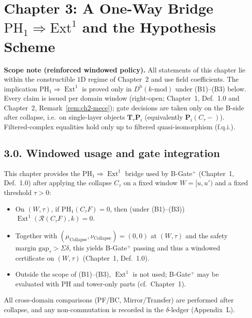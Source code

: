 \documentclass[11pt]{article}
\numberwithin{equation}{section}
\theoremstyle{plain}
\theoremstyle{definition}
\theoremstyle{remark}
\DeclareMathOperator{\Ext}{Ext}
\theoremstyle{plain}
\theoremstyle{definition}
\numberwithin{equation}{section}
\theoremstyle{definition}
\numberwithin{equation}{section}
\theoremstyle{plain}
\theoremstyle{definition}
\theoremstyle{remark}
\begin{document}
\section{Chapter 3: A One-Way Bridge \texorpdfstring{$\mathrm{PH}_1\!\Rightarrow\!\mathrm{Ext}^1$}{PH1⇒Ext1} and the Hypothesis Scheme}

\noindent\textbf{Scope note (reinforced windowed policy).}
All statements of this chapter lie within the constructible \(1\)D regime of Chapter~2 and use field coefficients.
The implication \(\mathrm{PH}_1\Rightarrow \Ext^1\) is proved only in \(D^{\mathrm{b}}(k\text{-mod})\) under \textup{(B1)}–\textup{(B3)} below.
Every claim is issued per domain window (right-open; Chapter~1, Def.~1.0 and Chapter~2, Remark~\ref{rem:ch2-mece}); gate decisions are taken only on the B-side after collapse, i.e.\ on single-layer objects \(\mathbf{T}_\tau\mathbf{P}_i\) (equivalently \(\mathbf{P}_i(C_\tau -)\)).
Filtered-complex equalities hold only up to filtered quasi-isomorphism (f.q.i.).

\subsection*{3.0. Windowed usage and gate integration}
This chapter provides the \(\mathrm{PH}_1\!\Rightarrow\!\Ext^1\) bridge used by B-Gate\(^{+}\) (Chapter~1, Def.~1.0) after applying the collapse \(C_\tau\) on a fixed window \(W=[u,u')\) and a fixed threshold \(\tau>0\):
\begin{itemize}
  \item On \((W,\tau)\), if \(\mathrm{PH}_1(C_\tau F)=0\), then (under \textup{(B1)}–\textup{(B3)}) \(\Ext^1(\mathcal{R}(C_\tau F),k)=0\).
  \item Together with \((\mu_{\mathrm{Collapse}},\nu_{\mathrm{Collapse}})=(0,0)\) at \((W,\tau)\) and the safety margin \(\mathrm{gap}_\tau>\Sigma\delta\), this yields B-Gate\(^{+}\) passing and thus a windowed certificate on \((W,\tau)\) (Chapter~1, Def.~1.0).
  \item Outside the scope of \textup{(B1)}–\textup{(B3)}, \(\Ext^1\) is not used; B-Gate\(^{+}\) may be evaluated with PH and tower-only parts (cf.\ Chapter~1).
\end{itemize}
All cross-domain comparisons (PF/BC, Mirror/Transfer) are performed after collapse, and any non-commutation is recorded in the \(\delta\)-ledger (Appendix~L).
\end{document}
